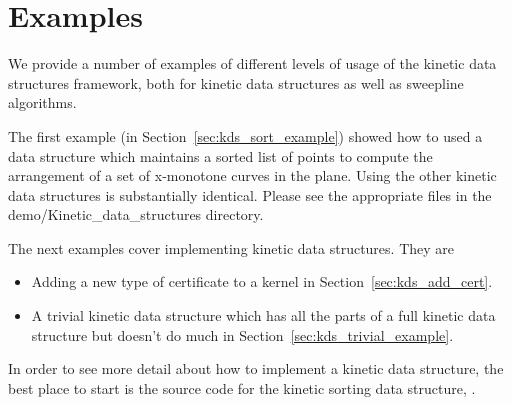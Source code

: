 \section{Examples\label{sec:kds_examples}}


We provide a number of examples of different levels of usage of the
kinetic data structures framework, both for kinetic data structures as
well as sweepline algorithms.

The first example (in Section~\ref{sec:kds_sort_example}) showed
how to used a data structure which maintains a sorted list of points
to compute the arrangement of a set of x-monotone curves in the
plane. Using the other kinetic data structures is substantially
identical. Please see the appropriate files in the
demo/Kinetic\_data\_structures directory.

The next examples cover implementing kinetic data structures. They are
\begin{itemize}
\item Adding a new type of certificate to a kernel in
  Section~\ref{sec:kds_add_cert}.
\item A trivial kinetic data structure which has all the parts of a
full kinetic data structure but doesn't do much in
Section~\ref{sec:kds_trivial_example}.
\end{itemize}

In order to see more detail about how to implement a kinetic data
structure, the best place to start is the source code for the kinetic
sorting data structure, .




